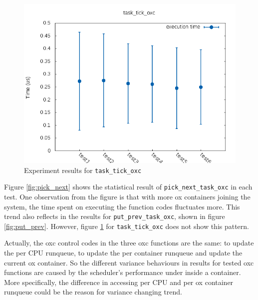 \begin{figure}[htbp]
        \centering
        \includegraphics[width=\textwidth]{images/task_tick_oxc}
        \caption{Experiment results for \texttt{task\_tick\_oxc}}
        \label{fig:task_tick}
\end{figure}
Figure \ref{fig:pick_next} shows the statistical result of 
\texttt{pick\_next\_task\_oxc} in each test. One observation from the figure
is that with more ox containers joining the system, the time spent on executing
the function codes fluctuates more. This trend also reflects in the
results for \texttt{put\_prev\_task\_oxc}, shown in figure \ref{fig:put_prev}.
However, figure \ref{fig:task_tick} for \texttt{task\_tick\_oxc} does not 
show this pattern.

Actually, the oxc control codes in the three oxc functions are the same:
to update the per CPU runqueue, to update the per container runqueue and
update the current ox container. So the different variance behaviours in
results for tested oxc functions are caused by the scheduler's performance
under inside a container. More specifically, the difference in accessing 
per CPU and per ox container runqueue could be the reason for variance 
changing trend. 


